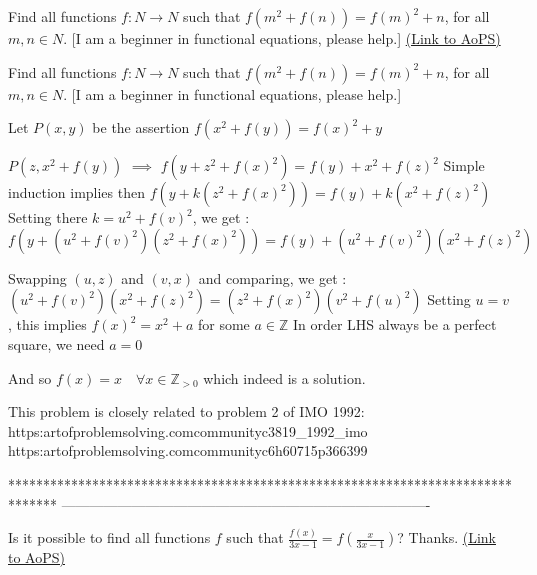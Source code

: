 \begin{problem}
	Find all functions $f:N\rightarrow N$ such that
$f(m^2+f(n))=f(m)^2+n$, for all $m, n\in N$.
[I am a beginner in functional equations, please help.]
	\flushright \href{https://artofproblemsolving.com/community/c6h1634550}{(Link to AoPS)}
\end{problem}



\begin{solution}
	\begin{tcolorbox}Find all functions $f:N\rightarrow N$ such that
$f(m^2+f(n))=f(m)^2+n$, for all $m, n\in N$.
[I am a beginner in functional equations, please help.]\end{tcolorbox}
Let $P(x,y)$ be the assertion $f(x^2+f(y))=f(x)^2+y$

$P(z,x^2+f(y))$ $\implies$ $f(y+z^2+f(x)^2)=f(y)+x^2+f(z)^2$
Simple induction implies then $f(y+k(z^2+f(x)^2))=f(y)+k(x^2+f(z)^2)$
Setting there $k=u^2+f(v)^2$, we get : $f(y+(u^2+f(v)^2)(z^2+f(x)^2))=f(y)+(u^2+f(v)^2)(x^2+f(z)^2)$

Swapping $(u,z)$ and $(v,x)$ and comparing, we get :
$(u^2+f(v)^2)(x^2+f(z)^2)=(z^2+f(x)^2)(v^2+f(u)^2)$
Setting $u=v$, this implies $f(x)^2=x^2+a$ for some $a\in\mathbb Z$
In order LHS always be a perfect square, we need $a=0$

And so $\boxed{f(x)=x\quad\forall x\in\mathbb Z_{>0}}$ which indeed is a solution.



\end{solution}



\begin{solution}
	This problem is closely related to problem 2 of IMO 1992:
https:\/\/artofproblemsolving.com\/community\/c3819_1992_imo
https:\/\/artofproblemsolving.com\/community\/c6h60715p366399

\end{solution}
*******************************************************************************
-------------------------------------------------------------------------------

\begin{problem}
	Is it possible to find all functions $f$ such that $\frac{f(x)}{3x-1}=f\left(\frac{x}{3x-1}\right)$? Thanks.
	\flushright \href{https://artofproblemsolving.com/community/c6h1634995}{(Link to AoPS)}
\end{problem}



